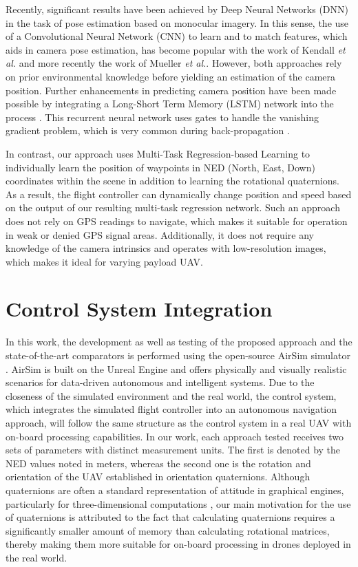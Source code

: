 \documentclass[letterpaper, 10 pt, journal, twoside]{IEEEtran}
\newcommand{\etal}{\emph{et al.}}
\begin{document}
Recently, significant results have been achieved by Deep Neural Networks (DNN) in the task of pose estimation based on monocular imagery. In this sense, the use of a Convolutional Neural Network (CNN) \cite{Kanellakis2017SurveyTrends} to learn and to match features, which aids in camera pose estimation, has become popular with the work of Kendall \etal \cite{kendall2015posenet} and more recently the work of Mueller \etal \cite{mueller2018uas}. However, both approaches rely on prior environmental knowledge before yielding an estimation of the camera position. Further enhancements in predicting camera position have been made possible by integrating a Long-Short Term Memory (LSTM) network into the process \cite{wang2017deepvo}. This recurrent neural network uses gates to handle the vanishing gradient problem, which is very common during back-propagation \cite{hochreiter1997long}.

In contrast, our approach uses Multi-Task Regression-based Learning to individually learn the position of waypoints in NED (North, East, Down) coordinates within the scene in addition to learning the rotational quaternions. As a result, the flight controller can dynamically change position and speed based on the output of our resulting multi-task regression network. Such an approach does not rely on GPS readings to navigate, which makes it suitable for operation in weak or denied GPS signal areas. Additionally, it does not require any knowledge of the camera intrinsics and operates with low-resolution images, which makes it ideal for varying payload UAV.      \section{Control System Integration}

In this work, the development as well as testing of the proposed approach and the state-of-the-art comparators \cite{bojarski2016end, kendall2015posenet, wang2017deepvo} is performed using the  open-source AirSim simulator \cite{shah2018airsim}. AirSim is built on the Unreal Engine \cite{karis2013real} and offers physically and visually realistic scenarios for data-driven autonomous and intelligent systems. Due to the closeness of the simulated environment and the real world, the control system, which integrates the simulated flight controller into an autonomous navigation approach, will follow the same structure as the control system in a real UAV with on-board processing capabilities. In our work, each approach tested receives two sets of parameters with distinct measurement units. The first is denoted by the NED values noted in meters, whereas the second one is the rotation and orientation of the UAV established in orientation quaternions. Although quaternions are often a standard representation of attitude in graphical engines, particularly for three-dimensional computations \cite{diebel2006representing}, our main motivation for the use of quaternions is attributed to the fact that calculating quaternions requires a significantly smaller amount of memory than calculating rotational matrices, thereby making them more suitable for on-board processing in drones deployed in the real world.
\end{document}
